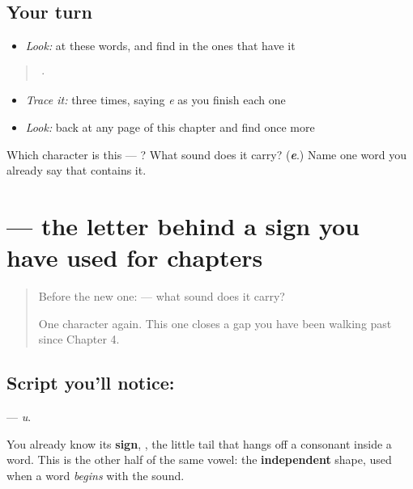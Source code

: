 \subsection*{Your turn}
\begin{itemize}
\raggedright
  \item \emph{Look:} at these words, and find  in the ones that have it
\end{itemize}

\begin{quote}
  ·  
\end{quote}

\begin{itemize}
\raggedright
  \item \emph{Trace it:}  three times, saying \emph{e} as you finish each one
  \item \emph{Look:} back at any page of this chapter and find  once more
\end{itemize}

\begin{tcolorbox}[breakable,colback=teal!4,colframe=teal!35!black,title={Before you move on}]
Which character is this — ? What sound does it carry? (\emph{\textbf{e}}.) Name one word you already say that contains it.
\end{tcolorbox}
\section[\texorpdfstring{\ta{உ} (u)}{உ (u)}]{ — the letter behind a sign you have used for chapters}

\label{lesson:TA-S125-letter-u}



\begin{quote}
Before the new one:  — what sound does it carry?

One character again. This one closes a gap you have been walking past since Chapter 4.
\end{quote}

\subsection*{Script you'll notice: }
\textbf{} — \emph{u}.

You already know its \textbf{sign}, , the little tail that hangs off a consonant inside a word. This is the other half of the same vowel: the \textbf{independent} shape, used when a word \emph{begins} with the sound.

